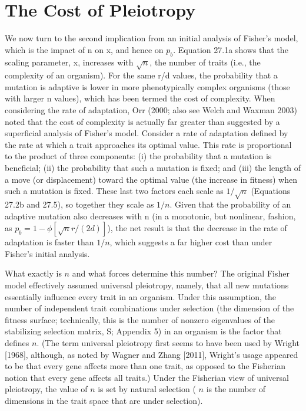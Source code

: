 \documentclass{article}
\begin{document}
\section{The Cost of Pleiotropy}
We now turn to the second implication from an initial analysis of Fisher's model, which is the impact of n on x, and hence on  $ p_b $. Equation 27.1a shows that the scaling parameter, x, increases with  $ \sqrt{n} $, the number of traits (i.e., the complexity of an organism). For the same r/d values, the probability that a mutation is adaptive is lower in more phenotypically complex organisms (those with larger n values), which has been termed the cost of complexity. When considering the rate of adaptation, Orr (2000; also see Welch and Waxman 2003) noted that the cost of complexity is actually far greater than suggested by a superficial analysis of Fisher's model. Consider a rate of adaptation defined by the rate at which a trait approaches its optimal value. This rate is proportional to the product of three components: (i) the probability that a mutation is beneficial; (ii) the probability that such a mutation is fixed; and (iii) the length of a move (or displacement) toward the optimal value (the increase in fitness) when such a mutation is fixed. These last two factors each scale as  $ 1/\sqrt{n} $ (Equations 27.2b and 27.5), so together they scale as  $ 1/n $. Given that the probability of an adaptive mutation also decreases with n (in a monotonic, but nonlinear, fashion, as  $ p_b = 1 - \phi[\sqrt{n}r/(2d)] $), the net result is that the decrease in the rate of adaptation is faster than  $ 1/n $, which suggests a far higher cost than under Fisher's initial analysis.

What exactly is  $ n $ and what forces determine this number? The original Fisher model effectively assumed universal pleiotropy, namely, that all new mutations essentially influence every trait in an organism. Under this assumption, the number of independent trait combinations under selection (the dimension of the fitness surface; technically, this is the number of nonzero eigenvalues of the stabilizing selection matrix, S; Appendix 5) in an organism is the factor that defines  $ n $. (The term universal pleiotropy first seems to have been used by Wright [1968], although, as noted by Wagner and Zhang [2011], Wright's usage appeared to be that every gene affects more than one trait, as opposed to the Fisherian notion that every gene affects all traits.) Under the Fisherian view of universal pleiotropy, the value of  $ n $ is set by natural selection ( $ n $ is the number of dimensions in the trait space that are under selection).
\end{document}
